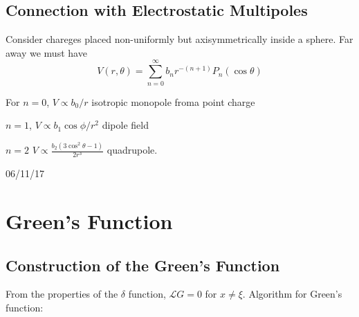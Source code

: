 \documentclass[a4paper]{article}
\renewcommand*\L{\mathcal{L}}
\begin{document}
\subsection{Connection with Electrostatic Multipoles}

Consider chareges placed non-uniformly but axisymmetrically inside a sphere. Far away we must have
\[
  V(r, \theta) = \sum_{n = 0}^{\infty} b_n r^{-(n + 1)} P_n(\cos \theta)
\]

For \(n = 0\), \(V \propto b_0/r\) isotropic monopole froma point charge

\(n = 1\), \(V \propto b_1 \cos \phi/r^2\) dipole field

\(n = 2\) \(V \propto \frac{b_2(3 \cos^2 \theta - 1)}{2r^3}\) quadrupole.

06/11/17

\section{Green's Function}

\subsection{Construction of the Green's Function}

From the properties of the \(\delta\) function, \(\L G = 0\) for \(x \neq \xi\). Algorithm for Green's function:
\end{document}
